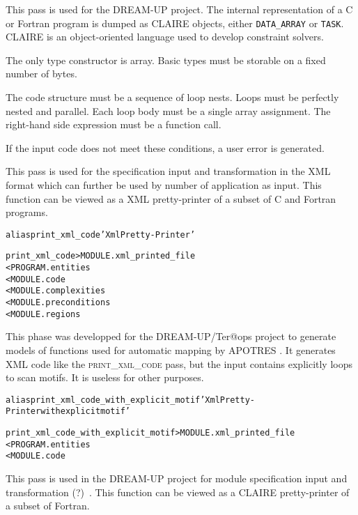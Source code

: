\documentclass[a4paper]{report}
\newenvironment{PipsMake}{\begin{alltt}}{\end{alltt}}
\begin{document}
This pass is used for the DREAM-UP project. The internal representation of
a C or Fortran program is dumped as CLAIRE objects, either
\texttt{DATA\_ARRAY} or \texttt{TASK}. CLAIRE is an object-oriented
language used to develop constraint solvers.

The only type constructor is array. Basic types must be storable on a
fixed number of bytes.

The code structure must be a sequence of loop nests. Loops must be
perfectly nested and parallel. Each loop body must be a single array
assignment. The right-hand side expression must be a function call.

If the input code does not meet these conditions, a user error is generated.

This pass is used for the specification input and transformation in the XML format which can further be used by number of application as input. This function can be viewed as a XML pretty-printer of a subset of C and Fortran programs.

\begin{PipsMake}
alias print_xml_code 'Xml Pretty-Printer'

print_xml_code      > MODULE.xml_printed_file
    < PROGRAM.entities
    < MODULE.code
    < MODULE.complexities
    < MODULE.preconditions
    < MODULE.regions
\end{PipsMake}

This phase was developped for the DREAM-UP/Ter@ops project to generate models
of functions used for automatic mapping by APOTRES \cite{}. It
generates XML code like the \textsc{print\_xml\_code} pass, but the
input contains explicitly loops to scan motifs. It is useless for
other purposes. 

\begin{PipsMake}
alias print_xml_code_with_explicit_motif 'Xml Pretty-Printer with explicit motif'

print_xml_code_with_explicit_motif       > MODULE.xml_printed_file
        < PROGRAM.entities
    < MODULE.code
\end{PipsMake}

This pass is used in the DREAM-UP project for module specification
input and transformation (?)~\cite{}. This function can be viewed as a
CLAIRE pretty-printer of a subset of Fortran.
\end{document}
